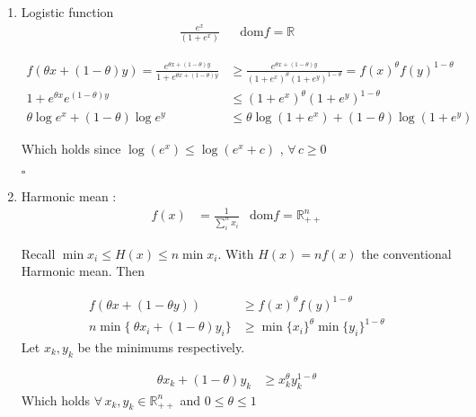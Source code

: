 \documentclass[a4paper,11pt]{article}
\begin{document}
\begin{enumerate}
\item Logistic function
\begin{equation}
\begin{aligned}
\frac{e^x}{(1+e^x)} && \text{dom} f = \mathbb{R}
\end{aligned}
\end{equation}

\begin{equation}
\begin{aligned}
f(\theta x + (1-\theta) y ) = \frac{e^{\theta x + (1-\theta) y}}{1+e^{\theta x + (1-\theta)y}} &\geq \frac{e^{\theta x + (1-\theta) y}}{(1+e^x)^\theta(1+e^y)^{1-\theta}} = f(x)^\theta f(y)^{1-\theta} \\
1+e^{\theta x} e^{(1-\theta)y} &\leq (1+e^x)^\theta(1+e^y)^{1-\theta} \\ 
 \theta \log e^{ x} + (1-\theta) \log e^{y}&\leq \theta \log (1 + e^x) + (1-\theta)\log (1+e^y)
\end{aligned}
\end{equation}

Which holds since $\log (e^x) \leq \log (e^x + c)$ , $\forall \, c \geq 0$  

\hspace{15.5cm}$\square$

\item Harmonic mean : 
\begin{equation}
\begin{aligned}
f(x) &= \frac{1}{\sum_i^nx_i} & \text{dom} f = \mathbb{R}_{++}^n
\end{aligned}
\end{equation}

Recall $\min{x_i}\leq H(x)\leq n\min{x_i}$. With $H(x) = n f(x)$ the conventional Harmonic mean. Then 

\begin{equation}
\begin{aligned}
f(\theta x + (1-\theta y)) &\geq f(x)^\theta f(y)^{1-\theta}\\
n\min\{\ \theta x_i +(1-\theta)y_i\} &\geq \min \{ x_i \}^{\theta} \min \{ y_i \}^{1-\theta}
\end{aligned}
\end{equation}
Let $x_k,y_k$ be the minimums respectively.

\begin{equation}
\begin{aligned}
\theta x_k +(1-\theta)y_k &\geq x^\theta_k y^{1-\theta}_k
\end{aligned}
\end{equation}
Which holds $\forall \, x_k, y_k \in \mathbb{R}^n_{++}$ and $0\leq \theta \leq 1$


\end{enumerate}
\end{document}
